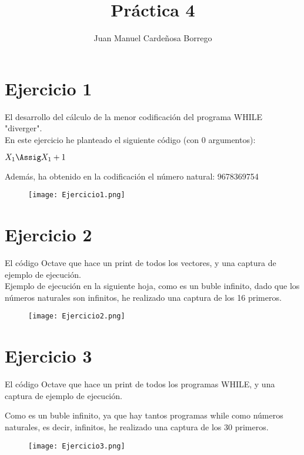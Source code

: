 \documentclass[11pt]{article}
\title{\textbf{Práctica 4}}
\author{Juan Manuel Cardeñosa Borrego}
\date{}
\begin{document}
\maketitle
\thispagestyle{empty}

\section*{Ejercicio 1}
El desarrollo del cálculo de la menor codificación del programa WHILE "diverger".
\\
En este ejercicio he planteado el siguiente código (con 0 argumentos):\\
\begin{whilecode}[H]

$X_1 \Assig X_1 + 1$\;
\end{whilecode}

Además, ha obtenido en la codificación el número natural: 9678369754

\begin{figure}[htp]
\centering
\texttt{[image: Ejercicio1.png]}
\end{figure}


\section*{Ejercicio 2}
El código Octave que hace un print de todos los vectores, y una captura de ejemplo de ejecución.\\



Ejemplo de ejecución en la siguiente hoja, como es un buble infinito, dado que los números naturales son infinitos, he realizado una captura de los 16 primeros.

\begin{figure}[htp]
\centering
\texttt{[image: Ejercicio2.png]}
\end{figure}

\newpage
\section*{Ejercicio 3}
El código Octave que hace un print de todos los programas WHILE, y una captura de ejemplo de ejecución.



Como es un buble infinito, ya que hay tantos programas while como números naturales, es decir, infinitos, he realizado una captura de los 30 primeros.

\begin{figure}[htp]
\centering
\texttt{[image: Ejercicio3.png]}
\end{figure}
\end{document}
